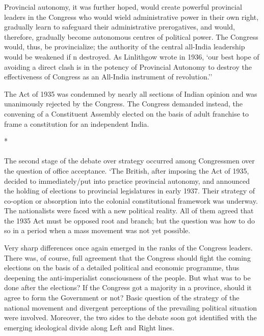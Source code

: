 Provincial autonomy, it was further hoped, would create powerful provincial leaders in the Congress who would wield administrative power in their own right, gradually learn to safeguard their administrative prerogatives, and would, therefore, gradually become autonomous centres of political power. The Congress would, thus, be provincialize; the authority of the central all-India leadership would be weakened if n destroyed. As Linlithgow wrote in 1936, `our best hope of avoiding a direct clash is in the potency of Provincial Autonomy to destroy the effectiveness of Congress as an All-India instrument of revolution.'' 

The Act of 1935 was condemned by nearly all sections of Indian opinion and was unanimously rejected by the Congress. The Congress demanded instead, the convening of a Constituent Assembly elected on the basis of adult franchise to frame a constitution for an independent India.

\begin{center}*\end{center}

\paragraph*{}

The second stage of the debate over strategy occurred among Congressmen over the question of office acceptance. `The British, after imposing the Act of 1935, decided to immediately/put into practice provincial autonomy, and announced the holding of elections to provincial legislatures in early 1937. Their strategy of co-option or absorption into the colonial constitutional framework was underway. The nationalists were faced with a new political reality. All of them agreed that the 1935 Act must be opposed root and branch; but the question was how to do so in a period when a mass movement was not yet possible. 

Very sharp differences once again emerged in the ranks of the Congress leaders. There was, of course, full agreement that the Congress should fight the coming elections on the basis of a detailed political and economic programme, thus deepening the anti-imperialist consciousness of the people. But what was to be done after the elections? If the Congress got a majority in a province, should it agree to form the Government or not? Basic question of the strategy of the national movement and divergent perceptions of the prevailing political situation were involved. Moreover, the two sides to the debate soon got identified with the emerging ideological divide along Left and Right lines. 

